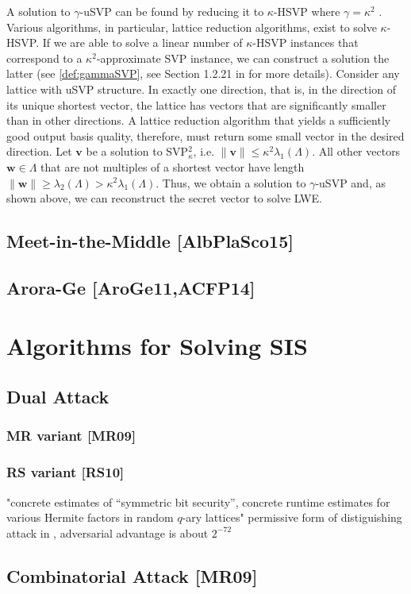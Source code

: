 A solution to $\gamma$-uSVP can be found by reducing it to $\kappa$-HSVP where $\gamma = \kappa^2$ \cite{APS15}. Various algorithms, in particular, lattice reduction algorithms, exist to solve $\kappa$-HSVP. If we are able to solve a linear number of $\kappa$-HSVP instances that correspond to a $\kappa^2$-approximate SVP instance, we can construct a solution the latter (see \cref{def:gammaSVP}, see Section 1.2.21 in \cite{Lov87} for more details). 
Consider any lattice with uSVP structure. In exactly one direction, that is, in the direction of its unique shortest vector, the lattice has vectors that are significantly smaller than in other directions. A lattice reduction algorithm that yields a sufficiently good output basis quality, therefore, must return some small vector in the desired direction. 
Let $\mathbf{v}$ be a solution to SVP$_\kappa^2$, i.e. $\|\mathbf{v}\| \leq \kappa^2 \lambda_1(\Lambda)$. All other vectors $\mathbf{w}\in \Lambda$ that are not multiples of a shortest vector have length $\|\mathbf{w}\| \geq \lambda_2(\Lambda) > \kappa^2\lambda_1(\Lambda)$. Thus, we obtain a solution to $\gamma$-uSVP and, as shown above, we can reconstruct the secret vector to solve LWE. 


\subsection{Meet-in-the-Middle [AlbPlaSco15]}
\subsection{Arora-Ge [AroGe11,ACFP14]}




\section{Algorithms for Solving SIS}
\subsection{Dual Attack}
\subsubsection{MR variant [MR09]}
\subsubsection{RS variant [RS10]}
"concrete estimates of ``symmetric bit security'', concrete runtime estimates for various Hermite factors in random $q$-ary lattices"
permissive form of distiguishing attack in \cite{MR09}, adversarial advantage is about $2^{-72}$
\subsection{Combinatorial Attack [MR09]}


